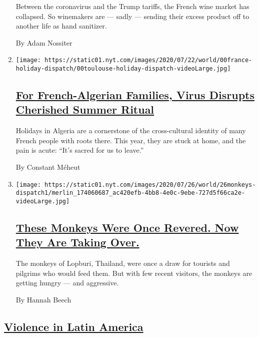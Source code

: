 \begin{enumerate}
  Between the coronavirus and the Trump tariffs, the French wine market
  has collapsed. So winemakers are --- sadly --- sending their excess
  product off to another life as hand sanitizer.

  By Adam Nossiter
\item
  \texttt{[image: https://static01.nyt.com/images/2020/07/22/world/00france-holiday-dispatch/00toulouse-holiday-dispatch-videoLarge.jpg]}

  \hypertarget{for-french-algerian-families-virus-disrupts-cherished-summer-ritual}{%
  \subsection{\texorpdfstring{\href{/2020/07/26/world/europe/france-algeria-summer-vacations.html}{For
  French-Algerian Families, Virus Disrupts Cherished Summer
  Ritual}}{For French-Algerian Families, Virus Disrupts Cherished Summer Ritual}}\label{for-french-algerian-families-virus-disrupts-cherished-summer-ritual}}

  Holidays in Algeria are a cornerstone of the cross-cultural identity
  of many French people with roots there. This year, they are stuck at
  home, and the pain is acute: ``It's sacred for us to leave.''

  By Constant Méheut
\item
  \texttt{[image: https://static01.nyt.com/images/2020/07/26/world/26monkeys-dispatch1/merlin\_174060687\_ac420efb-4bb8-4e0c-9ebe-727d5f66ca2e-videoLarge.jpg]}

  \hypertarget{these-monkeys-were-once-revered-now-they-are-taking-over}{%
  \subsection{\texorpdfstring{\href{/2020/07/25/world/asia/thailand-monkeys.html}{These
  Monkeys Were Once Revered. Now They Are Taking
  Over.}}{These Monkeys Were Once Revered. Now They Are Taking Over.}}\label{these-monkeys-were-once-revered-now-they-are-taking-over}}

  The monkeys of Lopburi, Thailand, were once a draw for tourists and
  pilgrims who would feed them. But with few recent visitors, the
  monkeys are getting hungry --- and aggressive.

  By Hannah Beech
\end{enumerate}

\hypertarget{violence-in-latin-america}{%
\subsection{\texorpdfstring{\href{/spotlight/violence-in-latin-america}{Violence
in Latin
America}}{Violence in Latin America}}\label{violence-in-latin-america}}

